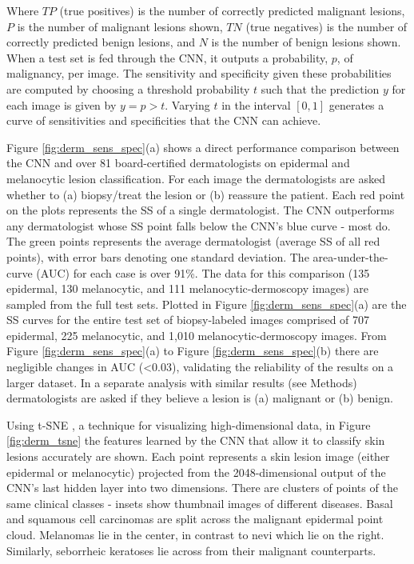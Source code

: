 Where $TP$ (true positives) is the number of correctly predicted malignant lesions, $P$ is the number of malignant lesions shown, $TN$ (true negatives) is the number of correctly predicted benign lesions, and $N$ is the number of benign lesions shown. When a test set is fed through the CNN, it outputs a probability, $p$, of malignancy, per image. The sensitivity and specificity given these probabilities are computed by choosing a threshold probability $t$ such that the prediction $y$ for each image is given by $y = p > t$. Varying $t$ in the interval $[0,1]$ generates a curve of sensitivities and specificities that the CNN can achieve.

Figure \ref{fig:derm_sens_spec}(a) shows a direct performance comparison between the CNN and over 81 board-certified dermatologists on epidermal and melanocytic lesion classification. For each image the dermatologists are asked whether to (a) biopsy/treat the lesion or (b) reassure the patient. Each red point on the plots represents the SS of a single dermatologist. The CNN outperforms any dermatologist whose SS point falls below the CNN’s blue curve - most do. The green points represents the average dermatologist (average SS of all red points), with error bars denoting one standard deviation. The area-under-the-curve (AUC) for each case is over 91\%. The data for this comparison (135 epidermal, 130 melanocytic, and 111 melanocytic-dermoscopy images) are sampled from the full test sets. Plotted in Figure \ref{fig:derm_sens_spec}(a) are the SS curves for the entire test set of biopsy-labeled images comprised of 707 epidermal, 225 melanocytic, and 1,010 melanocytic-dermoscopy images. From Figure \ref{fig:derm_sens_spec}(a) to Figure \ref{fig:derm_sens_spec}(b) there are negligible changes in AUC (<0.03), validating the reliability of the results on a larger dataset. In a separate analysis with similar results (see Methods) dermatologists are asked if they believe a lesion is (a) malignant or (b) benign.

Using t-SNE \cite{van2008visualizing}, a technique for visualizing high-dimensional data, in Figure \ref{fig:derm_tsne} the features learned by the CNN that allow it to classify skin lesions accurately are shown. Each point represents a skin lesion image (either epidermal or melanocytic) projected from the 2048-dimensional output of the CNN’s last hidden layer into two dimensions.  There are clusters of points of the same clinical classes - insets show thumbnail images of different diseases. Basal and squamous cell carcinomas are split across the malignant epidermal point cloud. Melanomas lie in the center, in contrast to nevi which lie on the right. Similarly, seborrheic keratoses lie across from their malignant counterparts. 

